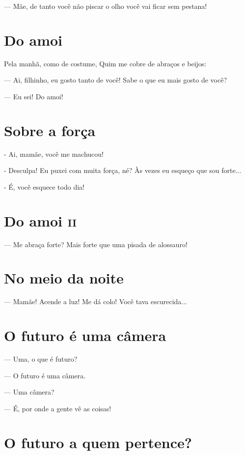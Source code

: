 --- Mãe, de tanto você não piscar o olho você vai ficar sem pestana!

\chapter{Do amoi}\label{do-amoi}

Pela manhã, como de costume, Quim me cobre de abraços e beijos:

--- Ai, filhinho, eu gosto tanto de você! Sabe o que eu mais gosto de
você?

--- Eu sei! Do amoi!

\chapter{Sobre a força}

- Ai, mamãe, você me machucou!

- Desculpa! Eu puxei com muita força, né? Às vezes eu esqueço que sou
forte...

- É, você esquece todo dia!

\chapter{Do amoi \textsc{ii}}

--- Me abraça forte? Mais forte que uma pisada de alossauro!

\chapter{No meio da noite}\label{no-meio-da-noite}

--- Mamãe! Acende a luz! Me dá colo! Você tava escurecida...

\chapter{O futuro é uma câmera}\label{o-futuro-uxe9-uma-cuxe2mera}

--- Uma, o que é futuro?

--- O futuro é uma câmera.

--- Uma câmera?

--- É, por onde a gente vê as coisas!

\chapter{O futuro a quem pertence?}\label{o-futuro-a-quem-pertence}



